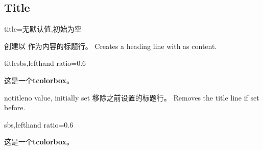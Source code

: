 \subsection{Title}%

\begin{docTcbKey}{title}{=}{无默认值,初始为空}

创建以  作为内容的标题行。\hfill
Creates a heading line with  as content.



\begin{exdispExample*}{title}{sbs,lefthand ratio=0.6}
\begin{tcolorbox}[title=我的标题行]
这是一个\textbf{tcolorbox}。
\end{tcolorbox}
\end{exdispExample*}
\end{docTcbKey}

\begin{docTcbKey}{notitle}{}{no value, initially set}
移除之前设置的标题行。
\hfill
Removes the title line if set before.



\begin{dispExample*}{sbs,lefthand ratio=0.6}
\begin{tcolorbox}[title=我的标题行,notitle]
这是一个\textbf{tcolorbox}。
\end{tcolorbox}
\end{dispExample*}
\end{docTcbKey}

